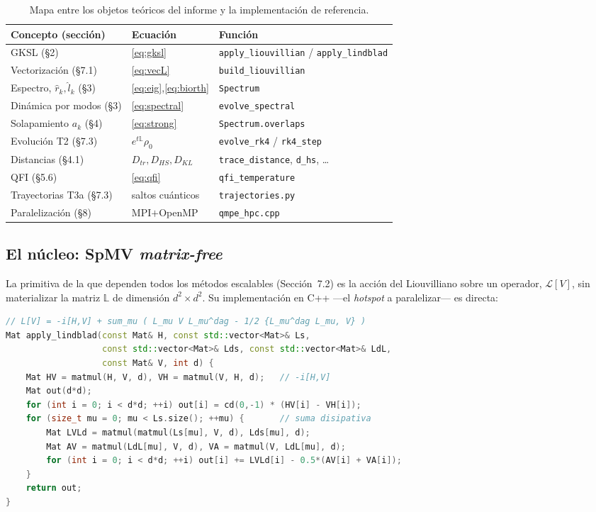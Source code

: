 \documentclass[11pt,a4paper]{article}
\theoremstyle{definition}
\theoremstyle{plain}
\begin{document}
\begin{table}[h]
\centering
\small
\begin{tabular}{@{}lll@{}}
\toprule
Concepto (sección) & Ecuación & Función \\
\midrule
GKSL (§2) & \eqref{eq:gksl} & \texttt{apply\_liouvillian} / \texttt{apply\_lindblad} \\
Vectorización (§7.1) & \eqref{eq:vecL} & \texttt{build\_liouvillian} \\
Espectro, $\hat r_k,\hat l_k$ (§3) & \eqref{eq:eig},\eqref{eq:biorth} & \texttt{Spectrum} \\
Dinámica por modos (§3) & \eqref{eq:spectral} & \texttt{evolve\_spectral} \\
Solapamiento $a_k$ (§4) & \eqref{eq:strong} & \texttt{Spectrum.overlaps} \\
Evolución T2 (§7.3) & $e^{t\mathbb L}\rho_0$ & \texttt{evolve\_rk4} / \texttt{rk4\_step} \\
Distancias (§4.1) & $D_{tr},D_{HS},D_{KL}$ & \texttt{trace\_distance}, \texttt{d\_hs}, \dots \\
QFI (§5.6) & \eqref{eq:qfi} & \texttt{qfi\_temperature} \\
Trayectorias T3a (§7.3) & saltos cuánticos & \texttt{trajectories.py} \\
Paralelización (§8) & MPI${+}$OpenMP & \texttt{qmpe\_hpc.cpp} \\
\bottomrule
\end{tabular}
\caption{Mapa entre los objetos teóricos del informe y la implementación de
referencia.}
\end{table}

\subsection{El núcleo: SpMV \emph{matrix-free}}

La primitiva de la que dependen todos los métodos escalables (Sección~7.2) es la
acción del Liouvilliano sobre un operador, $\mathcal L[V]$, sin materializar la
matriz $\mathbb L$ de dimensión $d^2\times d^2$. Su implementación en C++ ---el
\emph{hotspot} a paralelizar--- es directa:

\begin{lstlisting}[language=C++,caption={SpMV \emph{matrix-free} del Liouvilliano (\texttt{cpp/qmpe\_hpc.cpp}).}]
// L[V] = -i[H,V] + sum_mu ( L_mu V L_mu^dag - 1/2 {L_mu^dag L_mu, V} )
Mat apply_lindblad(const Mat& H, const std::vector<Mat>& Ls,
                   const std::vector<Mat>& Lds, const std::vector<Mat>& LdL,
                   const Mat& V, int d) {
    Mat HV = matmul(H, V, d), VH = matmul(V, H, d);   // -i[H,V]
    Mat out(d*d);
    for (int i = 0; i < d*d; ++i) out[i] = cd(0,-1) * (HV[i] - VH[i]);
    for (size_t mu = 0; mu < Ls.size(); ++mu) {       // suma disipativa
        Mat LVLd = matmul(matmul(Ls[mu], V, d), Lds[mu], d);
        Mat AV = matmul(LdL[mu], V, d), VA = matmul(V, LdL[mu], d);
        for (int i = 0; i < d*d; ++i) out[i] += LVLd[i] - 0.5*(AV[i] + VA[i]);
    }
    return out;
}
\end{lstlisting}
\end{document}
